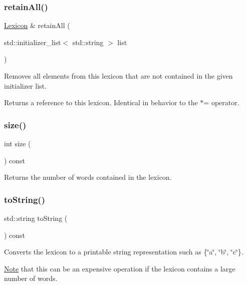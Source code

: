 \subsubsection{\texorpdfstring{retain\+All()}{retainAll()}\hspace{0.1cm}{\footnotesize\ttfamily [2/2]}}
{\footnotesize\ttfamily \mbox{\hyperlink{classLexicon}{Lexicon}} \& retain\+All (\begin{DoxyParamCaption}\item[{std\+::initializer\+\_\+list$<$ std\+::string $>$}]{list }\end{DoxyParamCaption})}



Removes all elements from this lexicon that are not contained in the given initializer list. 

Returns a reference to this lexicon. Identical in behavior to the $\ast$= operator. \mbox{\label{classLexicon_af9593d4a5ff4274efaf429cb4f9e57cc}} 
\subsubsection{\texorpdfstring{size()}{size()}}
{\footnotesize\ttfamily int size (\begin{DoxyParamCaption}{ }\end{DoxyParamCaption}) const}



Returns the number of words contained in the lexicon. 

\mbox{\label{classLexicon_a1fe5121d6528fdea3f243321b3fa3a49}} 
\subsubsection{\texorpdfstring{to\+String()}{toString()}}
{\footnotesize\ttfamily std\+::string to\+String (\begin{DoxyParamCaption}{ }\end{DoxyParamCaption}) const}



Converts the lexicon to a printable string representation such as {\ttfamily \{\char`\"{}a\char`\"{}, \char`\"{}b\char`\"{}, \char`\"{}c\char`\"{}\}}. 

\mbox{\hyperlink{classNote}{Note}} that this can be an expensive operation if the lexicon contains a large number of words. 

